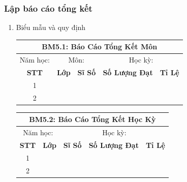\documentclass[a4paper]{article}
\begin{document}
	\subsubsection{Lập báo cáo tổng kết}
		\begin{enumerate}[label=\alph*.]
\item Biểu mẫu và quy định
\begin{table}[H]
    \centering
    \renewcommand{\arraystretch}{1.5}
    \setlength{\tabcolsep}{12pt} %
    \begin{tabular}{|c|c|c|c|c|}
    \hline
    \multicolumn{5}{|c|}{\textbf{BM5.1: Báo Cáo Tổng Kết Môn}} \\  
    \hline
    Năm học: & \multicolumn{2}{|c|}{Môn:} & \multicolumn{2}{c|}{Học kỳ: } \\  
    \hline
    \textbf{STT} & \textbf{Lớp} & \textbf{Sĩ Số} & \textbf{Số Lượng Đạt} & \textbf{Tỉ Lệ} \\  
    \hline
    1 & & & & \\  
    \hline
    2 & & & & \\  
    \hline
    \end{tabular}
\end{table}
	

\begin{table}[H]
    \centering
    \renewcommand{\arraystretch}{1.5}
    \setlength{\tabcolsep}{12pt} %
    \begin{tabular}{|c|c|c|c|c|}
    \hline
    \multicolumn{5}{|c|}{\textbf{BM5.2: Báo Cáo Tổng Kết Học Kỳ}} \\  
    \hline
      \multicolumn{2}{|c|}{Năm học: } &  \multicolumn{3}{|c|}{Học kỳ: } \\  
    \hline
    \textbf{STT} & \textbf{Lớp} & \textbf{Sĩ Số} & \textbf{Số Lượng Đạt} & \textbf{Tỉ Lệ} \\  
    \hline
    1 & & & & \\  
    \hline
    2 & & & & \\  
    \hline
    \end{tabular}
\end{table}


\end{enumerate}
\end{document}
